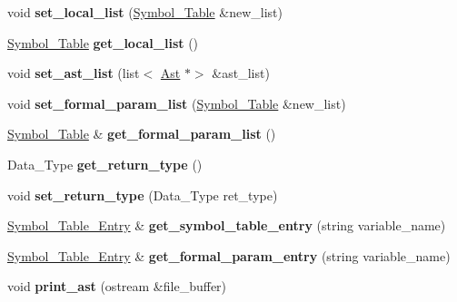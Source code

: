 \begin{DoxyCompactItemize}
void {\bfseries set\+\_\+local\+\_\+list} (\hyperlink{classSymbol__Table}{Symbol\+\_\+\+Table} \&new\+\_\+list)
\item 
\mbox{\label{classProcedure_abb766661ce9552a111e13fa3c98ab274}} 
\hyperlink{classSymbol__Table}{Symbol\+\_\+\+Table} {\bfseries get\+\_\+local\+\_\+list} ()
\item 
\mbox{\label{classProcedure_a75a08cfd0a8401c09d78fec666c87ef3}} 
void {\bfseries set\+\_\+ast\+\_\+list} (list$<$ \hyperlink{classAst}{Ast} $\ast$$>$ \&ast\+\_\+list)
\item 
\mbox{\label{classProcedure_a657086c14d842c25c8e20182b1aaac83}} 
void {\bfseries set\+\_\+formal\+\_\+param\+\_\+list} (\hyperlink{classSymbol__Table}{Symbol\+\_\+\+Table} \&new\+\_\+list)
\item 
\mbox{\label{classProcedure_a1e102b7cdd97bd7c9097c2f066d0e54e}} 
\hyperlink{classSymbol__Table}{Symbol\+\_\+\+Table} \& {\bfseries get\+\_\+formal\+\_\+param\+\_\+list} ()
\item 
\mbox{\label{classProcedure_a2d37282048f900e788976e0f836f1b39}} 
Data\+\_\+\+Type {\bfseries get\+\_\+return\+\_\+type} ()
\item 
\mbox{\label{classProcedure_a53266e4f419e083c1b625936ee5d87a7}} 
void {\bfseries set\+\_\+return\+\_\+type} (Data\+\_\+\+Type ret\+\_\+type)
\item 
\mbox{\label{classProcedure_a27205c6d035b4a1dce8084c1dfb283c8}} 
\hyperlink{classSymbol__Table__Entry}{Symbol\+\_\+\+Table\+\_\+\+Entry} \& {\bfseries get\+\_\+symbol\+\_\+table\+\_\+entry} (string variable\+\_\+name)
\item 
\mbox{\label{classProcedure_a9b428954dcaa183d7d9e9de6e9911c59}} 
\hyperlink{classSymbol__Table__Entry}{Symbol\+\_\+\+Table\+\_\+\+Entry} \& {\bfseries get\+\_\+formal\+\_\+param\+\_\+entry} (string variable\+\_\+name)
\item 
\mbox{\label{classProcedure_a6c0f80b0f5ee4fab28daa15c7e16d7f0}} 
void {\bfseries print\+\_\+ast} (ostream \&file\+\_\+buffer)
$$
\end{DoxyCompactItemize}
